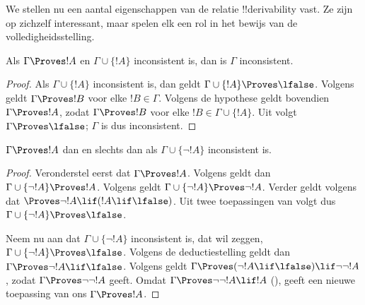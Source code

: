 \documentclass[../../../include/open-logic-section]{subfiles}
\begin{document}
      {}
      {}


We stellen nu een aantal eigenschappen van de relatie
!!{derivability} vast. Ze zijn op zichzelf interessant, maar spelen elk
een rol in het bewijs van de volledigheidsstelling.

\begin{prop}
  Als $\Gamma \Proves !A$ en $\Gamma \cup \{!A\}$ inconsistent is,
  dan is $\Gamma$ inconsistent.
\end{prop}

\begin{proof}
  Als $\Gamma \cup \{!A\}$ inconsistent is, dan geldt $\Gamma \cup
  \{!A\} \Proves \lfalse$. Volgens
   geldt $\Gamma \Proves !B$ voor elke
  $!B \in \Gamma$. Volgens de hypothese geldt bovendien $\Gamma
  \Proves !A$, zodat $\Gamma \Proves !B$ voor elke $!B \in \Gamma
  \cup \{!A\}$. Uit  volgt $\Gamma
  \Proves \lfalse$; $\Gamma$ is dus inconsistent.
\end{proof}

\begin{prop}
$\Gamma \Proves !A$ dan en slechts dan als $\Gamma \cup \{\lnot
!A\}$ inconsistent is.
\end{prop}

\begin{proof}
Veronderstel eerst dat $\Gamma \Proves !A$. Volgens
 geldt dan $\Gamma \cup \{\lnot !A\}
\Proves !A$. Volgens  geldt $\Gamma \cup
\{\lnot !A\} \Proves \lnot !A$. Verder geldt volgens
 dat $\Proves \lnot !A \lif (!A \lif \lfalse)$.
Uit twee toepassingen van  volgt dus $\Gamma \cup
\{\lnot !A\} \Proves \lfalse$.

Neem nu aan dat $\Gamma \cup \{\lnot !A\}$ inconsistent is, dat wil
zeggen, $\Gamma \cup \{\lnot !A\} \Proves \lfalse$. Volgens de
deductiestelling geldt dan $\Gamma \Proves \lnot !A \lif \lfalse$.
Volgens  geldt $\Gamma \Proves (\lnot !A \lif
\lfalse) \lif \lnot\lnot !A$, zodat  $\Gamma
\Proves \lnot\lnot !A$ geeft. Omdat $\Gamma \Proves \lnot\lnot !A
\lif !A$ (), geeft een nieuwe toepassing van
 ons $\Gamma \Proves !A$.
\end{proof}
\end{document}
